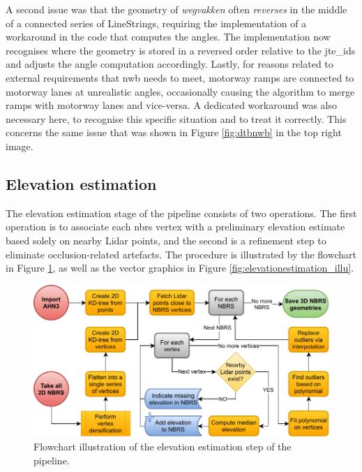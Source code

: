 A second issue was that the geometry of \textit{wegvakken} often \textit{reverses} in the middle of a connected series of LineStrings, requiring the implementation of a workaround in the code that computes the angles. The implementation now recognises where the geometry is stored in a reversed order relative to the \ac{jte_id}s and adjusts the angle computation accordingly. Lastly, for reasons related to external requirements that \ac{nwb} needs to meet, motorway ramps are connected to motorway lanes at unrealistic angles, occasionally causing the algorithm to merge ramps with motorway lanes and vice-versa. A dedicated workaround was also necessary here, to recognise this specific situation and to treat it correctly. This concerns the same issue that was shown in Figure \ref{fig:dtbnwb} in the top right image.

\subsection{Elevation estimation}
\label{sub:m_elevationestimation}

The elevation estimation stage of the pipeline consists of two operations. The first operation is to associate each \ac{nbrs} vertex with a preliminary elevation estimate based solely on nearby Lidar points, and the second is a refinement step to eliminate occlusion-related artefacts. The procedure is illustrated by the flowchart in Figure \ref{fig:elevationestimationflow}, as well as the vector graphics in Figure \ref{fig:elevationestimation_illu}.

\begin{figure}
    \centering
    \includegraphics[width=0.9\linewidth]{final_report/figs/elevation_estimation.pdf}
    \caption[Flowchart illustrating of the elevation estimation step]{Flowchart illustration of the elevation estimation step of the pipeline.}
    \label{fig:elevationestimationflow}
\end{figure}


